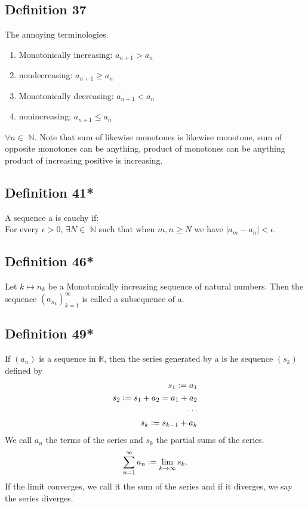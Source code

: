 \documentclass{article}
\begin{document}
\subsection{Definition 37}
The annoying terminologies.
\begin{enumerate}
\item Monotonically increasing: $a_{n+1}>a_n$
\item nondecreasing: $a_{n+1} \geq a_n$
\item Monotonically decreasing: $a_{n+1}<a_n$
\item nonincreasing: $a_{n+1} \leq a_n$
\end{enumerate}
$\forall n \in $ $\mathbb{N}$. Note that sum of likewise monotones is likewise
monotone, sum of opposite monotones can be anything, product of monotones can be anything
product of increasing positive is increasing.

\subsection{Definition 41*}
A sequence a is cauchy if: \\
\newline
For every $\epsilon>0$, $\exists N \in $ $\mathbb{N}$ such that when
$m,n \geq N$ we have $|a_m-a_n|<\epsilon$.

\subsection{Definition 46*}
Let $k \mapsto n_k$ be a Monotonically increasing sequence of natural numbers.
Then the sequence $(a_{n_k})^{\infty}_{k=1}$ is called a subsequence of a.

\subsection{Definition 49*}
If $(a_n)$ is a sequence in $\mathbb{R}$, then the series generated by a is he sequence
$(s_k)$ defined by \begin{align*}
s_1 \vcentcolon = a_1 \\
s_2 \vcentcolon = s_1 + a_2 = a_1 +a_2 \\
\cdots \\
s_k \vcentcolon= s_{k-1} + a_k
\end{align*}
We call $a_n$ the terms of the series and $s_k$ the partial sums of the series.
\[
\sum_{n=1}^{\infty} a_n \vcentcolon= \lim_{k \to \infty}s_k.
\]
If the limit converges, we call it the sum of the series and if it diverges,
we say the series diverges.
\newpage{}
\end{document}
